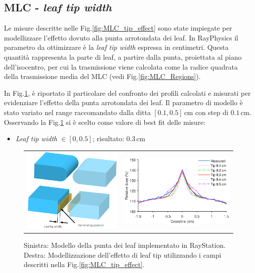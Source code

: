 \subsection{MLC - \textit{leaf tip width}}
Le misure descritte nelle Fig.\ref{fig:MLC_tip_effect} sono state impiegate per modellizzare l'effetto dovuto alla punta arrotondata dei leaf. In RayPhysics il parametro da ottimizzare è la \textit{leaf tip width} espressa in centimetri. Questa quantità rappresenta la parte di leaf, a partire dalla punta, proiettata al piano dell'isocentro, per cui la trasmissione viene calcolata come la radice quadrata della trasmissione media del MLC (vedi Fig.\ref{fig:MLC_Regions}).

In Fig.\ref{fig:MLC_tip_model}, è riportato il particolare del confronto dei profili calcolati e misurati per evidenziare l'effetto della punta arrotondata dei leaf. Il parametro di modello è stato variato nel range raccomandato dalla ditta $[0.1, 0.5]\,$cm con step di $0.1\,$cm. Osservando la Fig.\ref{fig:MLC_tip_model} si è scelto come valore di best fit delle misure:
\begin{itemize}
\item \textit{Leaf tip width} $\in [0,0.5]$; risultato: $0.3\,$cm
\end{itemize}

\begin{figure}[!t]
\centering
\begin{tabular}{m{}m{}}
\vspace*{-.3cm}\includegraphics[width=.38\textwidth]{./cap2/MLC_tip_model.png} &
\includegraphics[width=.6\textwidth]{./cap2/MLC_Plots/Abutted/PlotMLC_Tip_modeling.eps}
\end{tabular}
\caption{Sinistra: Modello della punta dei leaf implementato in RayStation. Destra: Modellizzazione dell'effetto di leaf tip utilizzando i campi descritti nella Fig.\ref{fig:MLC_tip_effect}.}
\label{fig:MLC_tip_model}
\end{figure}

